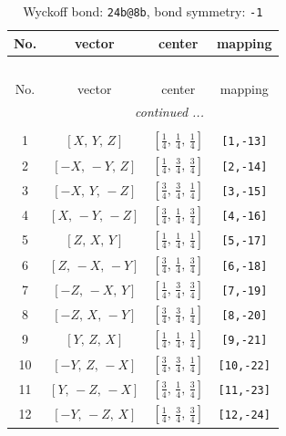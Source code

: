\documentclass[fleqn,8pt]{jsarticle}
\begin{document}
\begin{longtable}{cccc}
\caption{Wyckoff bond: {\tt 24b@8b}, bond symmetry: {\tt -1}}
 \\
 \hline \hline
No. & vector & center & mapping \\ \hline \endfirsthead

\multicolumn{3}{l}{\tablename\ \thetable{}} \\
 \hline \hline
No. & vector & center & mapping \\ \hline \endhead

 \hline \hline
\multicolumn{3}{r}{\footnotesize\it continued ...} \\ \endfoot

 \hline \hline
\multicolumn{3}{r}{} \\ \endlastfoot

1 & $\left[ X,\, Y,\, Z \right]$ & $\left[ \frac{1}{4},\, \frac{1}{4},\, \frac{1}{4} \right]$ & {\tt [1,-13]} \\ \hline
2 & $\left[ - X,\, - Y,\, Z \right]$ & $\left[ \frac{1}{4},\, \frac{3}{4},\, \frac{3}{4} \right]$ & {\tt [2,-14]} \\ \hline
3 & $\left[ - X,\, Y,\, - Z \right]$ & $\left[ \frac{3}{4},\, \frac{3}{4},\, \frac{1}{4} \right]$ & {\tt [3,-15]} \\ \hline
4 & $\left[ X,\, - Y,\, - Z \right]$ & $\left[ \frac{3}{4},\, \frac{1}{4},\, \frac{3}{4} \right]$ & {\tt [4,-16]} \\ \hline
5 & $\left[ Z,\, X,\, Y \right]$ & $\left[ \frac{1}{4},\, \frac{1}{4},\, \frac{1}{4} \right]$ & {\tt [5,-17]} \\ \hline
6 & $\left[ Z,\, - X,\, - Y \right]$ & $\left[ \frac{3}{4},\, \frac{1}{4},\, \frac{3}{4} \right]$ & {\tt [6,-18]} \\ \hline
7 & $\left[ - Z,\, - X,\, Y \right]$ & $\left[ \frac{1}{4},\, \frac{3}{4},\, \frac{3}{4} \right]$ & {\tt [7,-19]} \\ \hline
8 & $\left[ - Z,\, X,\, - Y \right]$ & $\left[ \frac{3}{4},\, \frac{3}{4},\, \frac{1}{4} \right]$ & {\tt [8,-20]} \\ \hline
9 & $\left[ Y,\, Z,\, X \right]$ & $\left[ \frac{1}{4},\, \frac{1}{4},\, \frac{1}{4} \right]$ & {\tt [9,-21]} \\ \hline
10 & $\left[ - Y,\, Z,\, - X \right]$ & $\left[ \frac{3}{4},\, \frac{3}{4},\, \frac{1}{4} \right]$ & {\tt [10,-22]} \\ \hline
11 & $\left[ Y,\, - Z,\, - X \right]$ & $\left[ \frac{3}{4},\, \frac{1}{4},\, \frac{3}{4} \right]$ & {\tt [11,-23]} \\ \hline
12 & $\left[ - Y,\, - Z,\, X \right]$ & $\left[ \frac{1}{4},\, \frac{3}{4},\, \frac{3}{4} \right]$ & {\tt [12,-24]} \\
\end{longtable}
\end{document}
